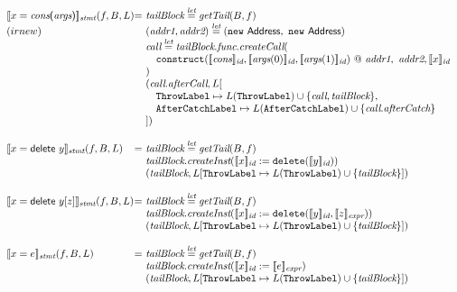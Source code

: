 \[
\begin{array}{l@{}l@{~}l}
\transfun{\ircfgnew{x}{\emph{cons}}{\emph{args}}}_{\emph{stmt}}(f, B, L)
& = & \emph{tailBlock} \letval \getTail(B, f)\\
(irnew) & & (\emph{addr1}, \emph{addr2}) \letval (\new\ \Address,\ \new\ \Address)\\
& & \emph{call} \letval \emph{tailBlock}.\emph{func}.\emph{createCall}(\\
& & \quad \TT{construct}(\transfun{\emph{cons}}_{\emph{id}}, \transfun{\emph{args}(0)}_{\emph{id}}, \transfun{\emph{args}(1)}_{\emph{id}}) ~@~ \emph{addr1},\ \emph{addr2}, \transfun{x}_{\emph{id}}\\
& & )\\
& & (\emph{call}.\emph{afterCall}, L[\\
& & \quad \ThrowLabel \mapsto L(\ThrowLabel) \cup \{ \emph{call}, \emph{tailBlock} \},\\
& & \quad \AfterCatchLabel \mapsto L(\AfterCatchLabel) \cup \{ \emph{call}.\emph{afterCatch} \}\\
& & ])\\
& & \\

\transfun{\irdelete{x}{y}}_{\emph{stmt}}(f, B, L)
& = & \emph{tailBlock} \letval \getTail(B, f)\\
& & \emph{tailBlock}.\emph{createInst}(\transfun{x}_{\emph{id}} := \TT{delete}(\transfun{y}_{\emph{id}}))\\
& & (\emph{tailBlock}, L[\ThrowLabel \mapsto L(\ThrowLabel) \cup \{ \emph{tailBlock} \}])\\
& & \\

\transfun{\irdeleteobj{x}{y}{z}}_{\emph{stmt}}(f, B, L)
& = & \emph{tailBlock} \letval \getTail(B, f)\\
& & \emph{tailBlock}.\emph{createInst}(\transfun{x}_{\emph{id}} := \TT{delete}(\transfun{y}_{\emph{id}}, \transfun{z}_{\emph{expr}}))\\
& & (\emph{tailBlock}, L[\ThrowLabel \mapsto L(\ThrowLabel) \cup \{ \emph{tailBlock} \}])\\
& & \\

\transfun{\ircfgexpr{x}{e}}_{\emph{stmt}}(f, B, L)
& = & \emph{tailBlock} \letval \getTail(B, f)\\
& & \emph{tailBlock}.\emph{createInst}(\transfun{x}_{\emph{id}} := \transfun{e}_{\emph{expr}})\\
& & (\emph{tailBlock}, L[\ThrowLabel \mapsto L(\ThrowLabel) \cup \{ \emph{tailBlock} \}])\\
& & \\


\end{array}\]
